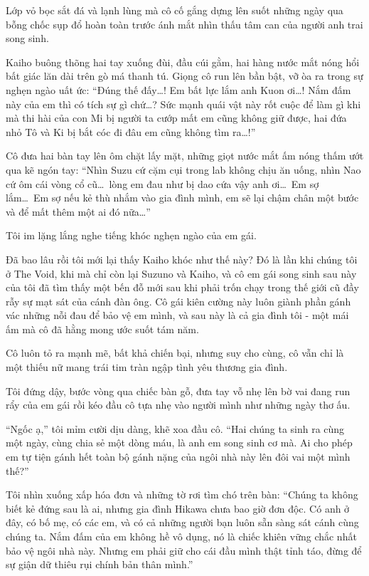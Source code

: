 \documentclass[../main.tex]{subfiles}
\begin{document}
Lớp vỏ bọc sắt đá và lạnh lùng mà cô cố gắng dựng lên suốt những ngày qua bỗng chốc sụp đổ hoàn toàn trước ánh mắt nhìn thấu tâm can của người anh trai song sinh.

Kaiho buông thõng hai tay xuống đùi, đầu cúi gằm, hai hàng nước mắt nóng hổi bất giác lăn dài trên gò má thanh tú. Giọng cô run lên bần bật, vỡ òa ra trong sự nghẹn ngào uất ức: ``Đúng thế đấy\dots! Em bất lực lắm anh Kuon ơi\dots! Nắm đấm này của em thì có tích sự gì chứ\dots? Sức mạnh quái vật này rốt cuộc để làm gì khi mà thi hài của con Mi bị người ta cướp mất em cũng không giữ được, hai đứa nhỏ Tô và Ki bị bắt cóc đi đâu em cũng không tìm ra\dots!''

Cô đưa hai bàn tay lên ôm chặt lấy mặt, những giọt nước mắt ấm nóng thấm ướt qua kẽ ngón tay: ``Nhìn Suzu cứ cặm cụi trong lab không chịu ăn uống, nhìn Nao cứ ôm cái vòng cổ cũ\dots\ lòng em đau như bị dao cứa vậy anh ơi\dots\ Em sợ lắm\dots\ Em sợ nếu kẻ thù nhắm vào gia đình mình, em sẽ lại chậm chân một bước và để mất thêm một ai đó nữa\dots''

Tôi im lặng lắng nghe tiếng khóc nghẹn ngào của em gái.

Đã bao lâu rồi tôi mới lại thấy Kaiho khóc như thế này? Đó là lần khi chúng tôi ở The Void, khi mà chỉ còn lại Suzuno và Kaiho, và cô em gái song sinh sau này của tôi đã tìm thấy một bến đỗ mới sau khi phải trốn chạy trong thế giới cũ đầy rẫy sự mạt sát của cánh đàn ông. Cô gái kiên cường này luôn giành phần gánh vác những nỗi đau để bảo vệ em mình, và sau này là cả gia đình tôi - một mái ấm mà cô đã hằng mong ước suốt tám năm.

Cô luôn tỏ ra mạnh mẽ, bất khả chiến bại, nhưng suy cho cùng, cô vẫn chỉ là một thiếu nữ mang trái tim tràn ngập tình yêu thương gia đình.

Tôi đứng dậy, bước vòng qua chiếc bàn gỗ, đưa tay vỗ nhẹ lên bờ vai đang run rẩy của em gái rồi kéo đầu cô tựa nhẹ vào người mình như những ngày thơ ấu.

``Ngốc ạ,'' tôi mỉm cười dịu dàng, khẽ xoa đầu cô. ``Hai chúng ta sinh ra cùng một ngày, cùng chia sẻ một dòng máu, là anh em song sinh cơ mà. Ai cho phép em tự tiện gánh hết toàn bộ gánh nặng của ngôi nhà này lên đôi vai một mình thế?''

Tôi nhìn xuống xấp hóa đơn và những tờ rơi tìm chó trên bàn: ``Chúng ta không biết kẻ đứng sau là ai, nhưng gia đình Hikawa chưa bao giờ đơn độc. Có anh ở đây, có bố mẹ, có các em, và có cả những người bạn luôn sẵn sàng sát cánh cùng chúng ta. Nắm đấm của em không hề vô dụng, nó là chiếc khiên vững chắc nhất bảo vệ ngôi nhà này. Nhưng em phải giữ cho cái đầu mình thật tỉnh táo, đừng để sự giận dữ thiêu rụi chính bản thân mình.''
\end{document}
